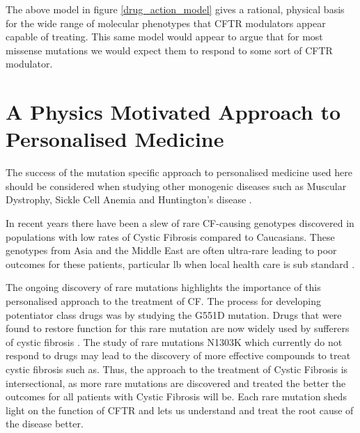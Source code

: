 The above model in figure \ref{drug_action_model} gives a rational, physical basis for the wide range of molecular phenotypes that CFTR modulators appear capable of treating. This same model would appear to argue that for most missense mutations we would expect them to respond to some sort of CFTR modulator.

\section{A Physics Motivated Approach to Personalised Medicine}

The success of the mutation specific approach to personalised medicine used here should be considered when studying other monogenic diseases such as Muscular  Dystrophy, Sickle Cell Anemia and Huntington's disease \cite{}. 

In recent years there have been a slew of rare CF-causing genotypes discovered in populations with low rates of Cystic Fibrosis compared to Caucasians. These genotypes from Asia and the Middle East are often ultra-rare leading to poor outcomes for these patients, particular lb when local health care is sub standard \cite{}. 

The ongoing discovery of rare mutations highlights the importance of this personalised approach to the treatment of CF. The process for developing potentiator class drugs was by studying the G551D mutation. Drugs that were found to restore function for this rare mutation are now widely used by sufferers of cystic fibrosis \cite{}. The study of rare mutations N1303K which currently do not respond to drugs may lead to the discovery of more effective compounds to treat cystic fibrosis such as. Thus, the approach to the treatment of Cystic Fibrosis is intersectional, as more rare mutations are discovered and treated the better the outcomes for all patients with Cystic Fibrosis will be. Each rare mutation sheds light on the function of CFTR and lets us understand and treat the root cause of the disease better.

